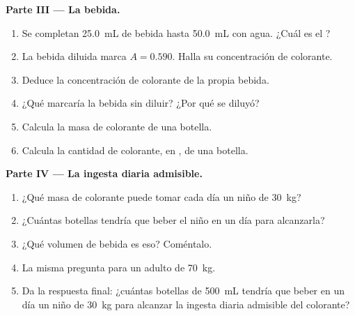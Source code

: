 \begin{problem}
\medskip
\noindent\textbf{Parte III --- La bebida.}
\begin{enumerate}[resume]
  \item Se completan \qty{25.0}{mL} de bebida hasta \qty{50.0}{mL} con
        agua. ¿Cuál es el ?
  \item La bebida diluida marca $A = 0.590$. Halla su concentración de
        colorante.
  \item Deduce la concentración de colorante de la propia bebida.
  \item ¿Qué marcaría la bebida sin diluir? ¿Por qué se diluyó?
  \item Calcula la masa de colorante de una botella.
  \item Calcula la cantidad de colorante, en , de una botella.
\end{enumerate}

\medskip
\noindent\textbf{Parte IV --- La ingesta diaria admisible.}
\begin{enumerate}[resume]
  \item ¿Qué masa de colorante puede tomar cada día un niño de
        \qty{30}{kg}?
  \item ¿Cuántas botellas tendría que beber el niño en un día para
        alcanzarla?
  \item ¿Qué volumen de bebida es eso? Coméntalo.
  \item La misma pregunta para un adulto de \qty{70}{kg}.
  \item Da la respuesta final: ¿cuántas botellas de \qty{500}{mL}
        tendría que beber en un día un niño de \qty{30}{kg} para
        alcanzar la ingesta diaria admisible del colorante?
\end{enumerate}
\end{problem}
